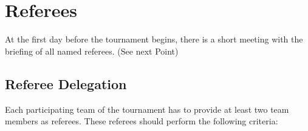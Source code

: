 \documentclass[12pt,twoside]{article}
\newcommand{\mytable}[1]{\savebox{\myt}{#1}\tikz\node[fill=gray!25!white]{\usebox{\myt}};}
\begin{document}
%
%


\section{Referees}

At the first day before the tournament begins, there is a short meeting with the briefing of all 
named referees. (See next Point) 

\subsection{Referee Delegation}
Each participating team of the tournament has to provide at least two team members as referees. These referees should perform the following criteria:
\end{document}
